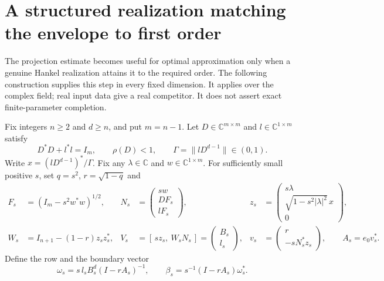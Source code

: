 


\section{A structured realization matching the envelope to first order}
\label{I:R:sec:v4-matching}

The projection estimate becomes useful for optimal approximation only
when a genuine Hankel realization attains it to the required order.
The following construction supplies this step in every fixed dimension.
It applies over the complex field; real input data give a real
competitor.  It does not assert exact finite-parameter completion.

\begin{theorem}\label{I:R:thm:v4-matching}
Fix integers $n\ge2$ and $d\ge n$, and put $m=n-1$.  Let
$D\in\mathbb C^{m\times m}$ and $l\in\mathbb C^{1\times m}$ satisfy
\[
 D^*D+l^*l=I_m,\qquad \rho(D)<1,\qquad
 \Gamma=\|lD^{d-1}\|\in(0,1).
\]
Write $x=(lD^{d-1})^*/\Gamma$.  Fix any
$\lambda\in\mathbb C$ and $w\in\mathbb C^{1\times m}$.
For sufficiently small positive $s$, set $q=s^2$, $r=\sqrt{1-q}$ and
\begin{align}
 F_s&=(I_m-s^2w^*w)^{1/2},&
 N_s&=\begin{pmatrix}sw\\DF_s\\lF_s\end{pmatrix},&
 z_s&=\begin{pmatrix}s\lambda\\
       \sqrt{1-s^2|\lambda|^2}\,x\\0\end{pmatrix},\label{I:R:eq:v4-match-trial}\\
 W_s&=I_{n+1}-(1-r)z_sz_s^*,&
 V_s&=[\,sz_s,\ W_sN_s\,]
       =\begin{pmatrix}B_s\\l_s\end{pmatrix},&
 v_s&=\begin{pmatrix}r\\-sN_s^*z_s\end{pmatrix},\qquad
 A_s=e_0v_s^*.\label{I:R:eq:v4-match-tuple}
\end{align}
Define the row and the boundary vector
\begin{equation}
 \omega_s=s\,l_sB_s^d(I-rA_s)^{-1},\qquad
 \beta_s=s^{-1}(I-rA_s)\omega_s^*.
 \label{I:R:eq:v4-match-beta}

\end{equation}
\end{theorem}
